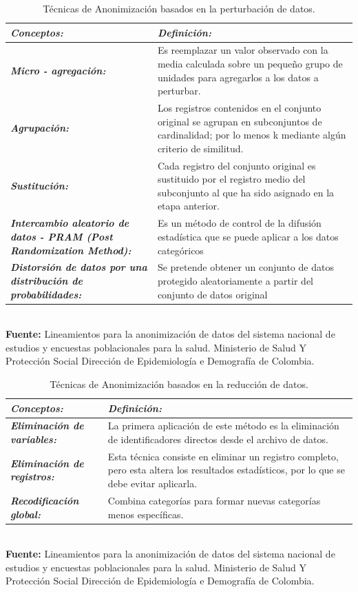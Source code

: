 \documentclass[a4paper,openright,12pt]{book}
\theoremstyle{definition}
\theoremstyle{remark}
\begin{document}
\begin{table}[ht]
\centering
\caption{Técnicas de Anonimización basados en la perturbación de datos.}
\begin{tabular}{>{\centering\arraybackslash}m{3cm} >{\arraybackslash}m{10cm} }
\hline
\textbf{\textit{Conceptos:}} & \textbf{\textit{Definición:}} \\ \hline
\textbf{\textit{Micro - agregación:}} & Es reemplazar un valor observado con la media calculada sobre un pequeño grupo de unidades para agregarlos a los datos a perturbar. \\ \hline
\textbf{\textit{Agrupación:}} & Los registros contenidos en el conjunto original se agrupan en subconjuntos de cardinalidad; por lo menos k mediante algún criterio de similitud.\\ \hline
\textbf{\textit{Sustitución:}} & Cada registro del conjunto original es sustituido por el registro medio del subconjunto al que ha sido asignado en la etapa anterior. \\ \hline
\textbf{\textit{Intercambio aleatorio de datos - PRAM (Post Randomization Method):}} & Es un método de control de la difusión estadística que se puede aplicar a los datos categóricos \\ \hline
\textbf{\textit{Distorsión de datos por una distribución de probabilidades:}} & Se pretende obtener un conjunto de datos protegido aleatoriamente a partir del conjunto de datos original \\ \hline
\end{tabular}
\label{tabla:RobustezPropiedades}
\\\textbf{Fuente:} Lineamientos para la anonimización de datos del sistema nacional de estudios y encuestas poblacionales para la salud. Ministerio de Salud Y Protección Social Dirección de Epidemiología e Demografía de Colombia.
\end{table}

\begin{table}[htbp]
\centering
\caption{Técnicas de Anonimización basados en la reducción de datos.}
\begin{tabular}{>{\centering\arraybackslash}m{3cm} >{\arraybackslash}m{10cm} }
\hline
\textbf{\textit{Conceptos:}} & \textbf{\textit{Definición:}} \\ \hline
\textbf{\textit{Eliminación de variables:}} & La primera aplicación de este método es la eliminación de identificadores directos desde el archivo de datos. \\ \hline
\textbf{\textit{Eliminación de registros:}} & Esta técnica consiste en eliminar un registro completo, pero esta altera los resultados estadísticos, por lo que se debe evitar aplicarla.  \\ \hline
\textbf{\textit{Recodificación global:}} & Combina categorías para formar nuevas categorías menos específicas. \\ \hline
\end{tabular}
\label{tabla:RobustezPropiedades}
\\\textbf{Fuente:} Lineamientos para la anonimización de datos del sistema nacional de estudios y encuestas poblacionales para la salud. Ministerio de Salud Y Protección Social Dirección de Epidemiología e Demografía de Colombia.
\end{table}
\end{document}
